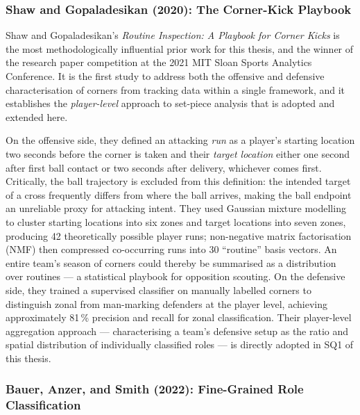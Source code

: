 \subsubsection{Shaw and Gopaladesikan (2020): The Corner-Kick Playbook}

Shaw and Gopaladesikan's \emph{Routine Inspection: A Playbook for Corner Kicks}
\cite{ShawGopaladesikan2020} is the most methodologically influential
prior work for this thesis, and the winner of the research paper competition at
the 2021 MIT Sloan Sports Analytics Conference. It is the first study to address
both the offensive and defensive characterisation of corners from tracking data
within a single framework, and it establishes the \emph{player-level} approach
to set-piece analysis that is adopted and extended here.

On the offensive side, they defined an attacking \emph{run} as a player's
starting location two seconds before the corner is taken and their \emph{target
location} either one second after first ball contact or two seconds after
delivery, whichever comes first. Critically, the ball trajectory is excluded from
this definition: the intended target of a cross frequently differs from where the
ball arrives, making the ball endpoint an unreliable proxy for attacking intent.
They used Gaussian mixture modelling to cluster starting locations into six zones
and target locations into seven zones, producing 42 theoretically possible
player runs; non-negative matrix factorisation (NMF) then compressed
co-occurring runs into 30 ``routine'' basis vectors. An entire team's season of
corners could thereby be summarised as a distribution over routines --- a
statistical playbook for opposition scouting. On the defensive side, they trained
a supervised classifier on manually labelled corners to distinguish zonal from
man-marking defenders at the player level, achieving approximately 81\,\% precision
and recall for zonal classification. Their player-level aggregation approach ---
characterising a team's defensive setup as the ratio and spatial distribution of
individually classified roles --- is directly adopted in SQ1 of this thesis.

\subsubsection{Bauer, Anzer, and Smith (2022): Fine-Grained Role Classification}

